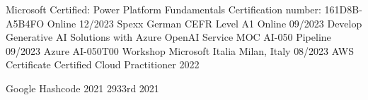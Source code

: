 
\begin{cvhonors}

\cvhonor
{Microsoft Certified: Power Platform Fundamentals} %
{Certification number: 161D8B-A5B4FO} %
{Online} %
{12/2023} %
\cvhonor
{Spexx German CEFR Level A1} %
{} %
{Online} %
{09/2023} %
  \cvhonor
    {Develop Generative AI Solutions with Azure OpenAI Service MOC AI-050} %
    {Pipeline} %
    {} %
    {09/2023} %
  \cvhonor
    {Azure AI-050T00} %
    {Workshop Microsoft Italia} %
    {Milan, Italy} %
    {08/2023} %
  \cvhonor
    {AWS Certificate} %
    {Certified Cloud Practitioner} %
    {} %
    {2022} %


  \cvhonor
    {Google Hashcode 2021} %
    {2933rd} %
    {} %
    {2021} %


\end{cvhonors}



